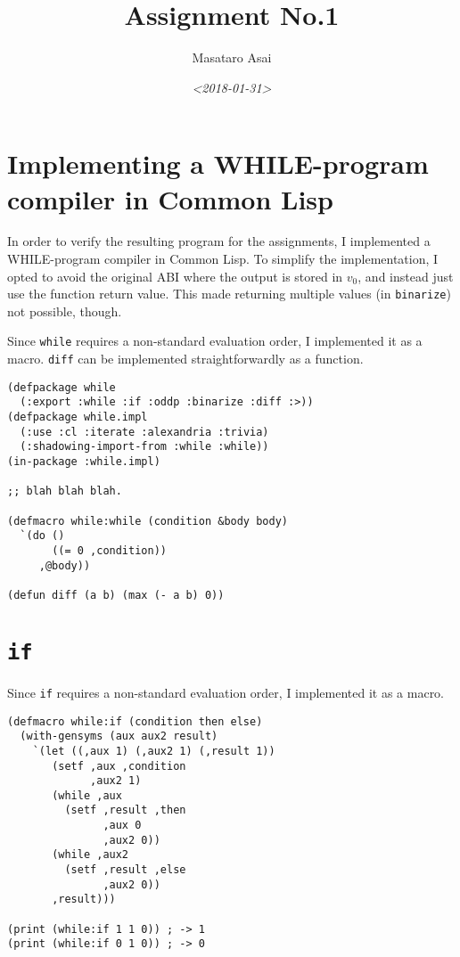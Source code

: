 \documentclass{article}
\author{Masataro Asai}
\date{\textit{<2018-01-31>} }
\title{Assignment No.1}
\begin{document}
\maketitle

\section{Implementing a WHILE-program compiler in Common Lisp}
\label{sec:orgbfa9313}

In order to verify the resulting program for the assignments, I implemented a
WHILE-program compiler in Common Lisp.  To simplify the implementation, I opted
to avoid the original ABI where the output is stored in $v_0$, and instead just
use the function return value. This made returning multiple
values (in \texttt{binarize}) not possible, though.

Since \texttt{while} requires a non-standard evaluation order, I implemented it as a macro.
\texttt{diff} can be implemented straightforwardly as a function.

\begin{verbatim}
(defpackage while
  (:export :while :if :oddp :binarize :diff :>))
(defpackage while.impl
  (:use :cl :iterate :alexandria :trivia)
  (:shadowing-import-from :while :while))
(in-package :while.impl)

;; blah blah blah.

(defmacro while:while (condition &body body)
  `(do ()
       ((= 0 ,condition))
     ,@body))

(defun diff (a b) (max (- a b) 0))
\end{verbatim}

\section{\texttt{if}}
\label{sec:orgdd60bb7}

Since \texttt{if} requires a non-standard evaluation order, I implemented it as a macro.

\begin{verbatim}
(defmacro while:if (condition then else)
  (with-gensyms (aux aux2 result)
    `(let ((,aux 1) (,aux2 1) (,result 1))
       (setf ,aux ,condition
             ,aux2 1)
       (while ,aux
         (setf ,result ,then
               ,aux 0
               ,aux2 0))
       (while ,aux2
         (setf ,result ,else
               ,aux2 0))
       ,result)))

(print (while:if 1 1 0)) ; -> 1
(print (while:if 0 1 0)) ; -> 0
\end{verbatim}
\end{document}
